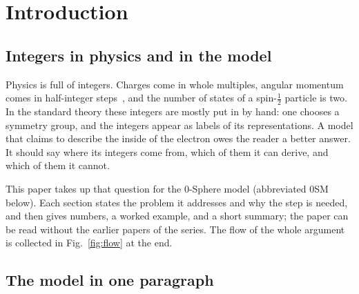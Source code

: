 \documentclass[%
 reprint, amsmath,amssymb, aps, prb, ]{revtex4-2}
\numberwithin{equation}{section}
\begin{document}
\begin{abstract}
Metric structure is not needed while the two kernels merely sit; it enters with transport, together with the constitutive relation and the fine-structure constant.
We state explicitly that the model derives the integer of charge, its existence, quantization, conservation and sign, but not its size: the fine-structure constant is not derived here, nor is the coupling to the electromagnetic potential or the light-cone structure.
The decisive test is experimental: the internal transport speed $\beta c\approx0.04\,c$, fixed with no free parameter, is unmeasured and would confirm or exclude the internal clock.
\end{abstract}

\maketitle

\onecolumngrid
\tableofcontents
\clearpage
\twocolumngrid

\section{Introduction}
\label{sec:intro}

\subsection{Integers in physics and in the model}

Physics is full of integers. Charges come in whole multiples, angular momentum comes in half-integer steps~\cite{ref:uhlenbeck,ref:sakurai}, and the number of states of a spin-$\tfrac12$ particle is two. In the standard theory these integers are mostly put in by hand: one chooses a symmetry group, and the integers appear as labels of its representations. A model that claims to describe the inside of the electron owes the reader a better answer. It should say where its integers come from, which of them it can derive, and which of them it cannot.

This paper takes up that question for the 0-Sphere model (abbreviated 0SM below). Each section states the problem it addresses and why the step is needed, and then gives numbers, a worked example, and a short summary; the paper can be read without the earlier papers of the series. The flow of the whole argument is collected in Fig.~\ref{fig:flow} at the end.

\subsection{The model in one paragraph}
\end{document}
